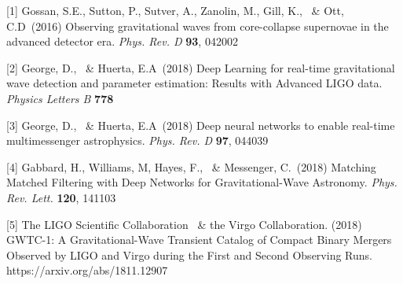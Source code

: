 \documentclass{article}
\begin{document}
[1] Gossan, S.E., Sutton, P., Sutver, A., Zanolin, M., Gill, K., \ \& Ott, C.D\ (2016) Observing gravitational waves from core-collapse supernovae in the advanced detector era. {\it Phys. Rev. D} {\bf 93}, 042002

[2] George, D., \ \& Huerta, E.A\ (2018) 
Deep Learning for real-time gravitational wave detection and parameter estimation: Results with Advanced LIGO data. {\it Physics Letters B} {\bf 778}

[3] George, D., \ \& Huerta, E.A\ (2018) Deep neural networks to enable real-time multimessenger astrophysics. {\it Phys. Rev. D} {\bf 97}, 044039

[4] Gabbard, H., Williams, M, Hayes, F., \ \&  Messenger, C.\ (2018) Matching Matched Filtering with Deep Networks for Gravitational-Wave Astronomy. {\it
Phys. Rev. Lett.} {\bf 120}, 141103

[5] The LIGO Scientific Collaboration \ \& the Virgo Collaboration. (2018) GWTC-1: A Gravitational-Wave Transient Catalog of Compact Binary Mergers Observed by LIGO and Virgo during the First and Second Observing Runs. https://arxiv.org/abs/1811.12907

 
\end{document}
